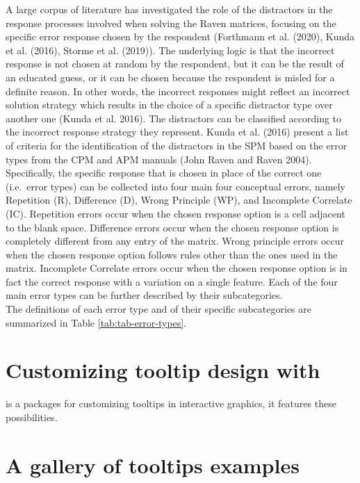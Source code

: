 A large corpus of literature has investigated the role of the distractors in the response processes involved when solving the Raven matrices, focusing on the specific error response chosen by the respondent (Forthmann et al. (2020), Kunda et al. (2016), Storme et al. (2019)).
The underlying logic is that the incorrect response is not chosen at random by the respondent, but it can be the result of an educated guess, or it can be chosen because the respondent is misled for a definite reason.
In other words, the incorrect responses might reflect an incorrect solution strategy which results in the choice of a specific distractor type over another one (Kunda et al. 2016). The distractors can be classified according to the incorrect response strategy they represent.
Kunda et al. (2016) present a list of criteria for the identification of the distractors in the SPM based on the error types from the CPM and APM manuals (John Raven and Raven 2004). Specifically, the specific response that is chosen in place of the correct one (i.e.~error types) can be collected into four main four conceptual errors, namely Repetition (R), Difference (D), Wrong Principle (WP), and Incomplete Correlate (IC).
Repetition errors occur when the chosen response option is a cell adjacent to the blank space.
Difference errors occur when the chosen response option is completely different from any entry of the matrix.
Wrong principle errors occur when the chosen response option follows rules other than the ones used in the matrix. Incomplete Correlate errors occur when the chosen response option is in fact the correct response with a variation on a single feature. Each of the four main error types can be further described by their subcategories.\\
The definitions of each error type and of their specific subcategories are summarized in Table \ref{tab:tab-error-types}.

\hypertarget{customizing-tooltip-design-with}{%
\section{\texorpdfstring{Customizing tooltip design with }{Customizing tooltip design with }}\label{customizing-tooltip-design-with}}

 is a packages for customizing tooltips in interactive graphics, it features these possibilities.

\hypertarget{a-gallery-of-tooltips-examples}{%
\section{A gallery of tooltips examples}\label{a-gallery-of-tooltips-examples}}


